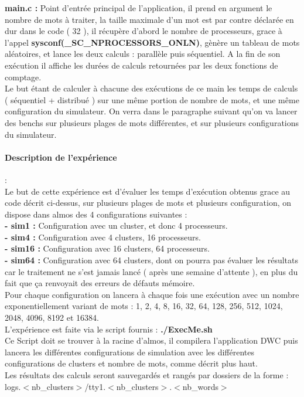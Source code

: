 \textbf{main.c :} Point d'entrée principal de l'application, il prend en argument le nombre de mots à traiter, la taille maximale d'un mot est par contre déclarée en dur dans le code ( 32 ), il récupère d'abord le nombre de processeurs, grace à l'appel \textbf{sysconf(\_SC\_NPROCESSORS\_ONLN)}, gènère un tableau de mots aléatoires, et lance les deux calculs : parallèle puis séquentiel. A la fin de son exécution il affiche les durées de calculs retournées par les deux fonctions de comptage.\\
Le but étant de calculer à chacune des exécutions de ce main les temps de calculs ( séquentiel + distribué ) sur une même portion de nombre de mots, et une même configuration du simulateur. On verra dans le paragraphe suivant qu'on va lancer des benchs sur plusieurs plages de mots différentes, et sur plusieurs configurations du simulateur.

\paragraph{Description de l'expérience}:\\

Le but de cette expérience est d'évaluer les temps d'exécution obtenus grace au code décrit ci-dessus, sur plusieurs plages de mots et plusieurs configuration, on dispose dans almos des 4 configurations suivantes :\\
\textbf{- sim1  :} Configuration avec un cluster, et donc 4 processeurs.\\
\textbf{- sim4  :} Configuration avec 4 clusters, 16 processeurs.\\
\textbf{- sim16 :} Configuration avec 16 clusters, 64 processeurs.\\
\textbf{- sim64 :} Configuration avec 64 clusters, dont on pourra pas évaluer les résultats car le traitement ne s'est jamais lancé ( après une semaine d'attente ), en plus du fait que ça renvoyait des erreurs de défauts mémoire.\\
Pour chaque configuration on lancera à chaque fois une exécution avec un nombre exponentiellement variant de mots : 1, 2, 4, 8, 16, 32, 64, 128, 256, 512, 1024, 2048, 4096, 8192 et 16384.\\
L'expérience est faite via le script fournis : \textbf{./ExecMe.sh}\\
Ce Script doit se trouver à la racine d'almos, il compilera l'application DWC puis lancera les différentes configurations de simulation avec les différentes configurations de clusters et nombre de mots, comme décrit plus haut.\\
Les résultats des calculs seront sauvegardés et rangés par dossiers de la forme : logs.$<$nb\_clusters$>$/tty1.$<$nb\_clusters$>$.$<$nb\_words$>$
